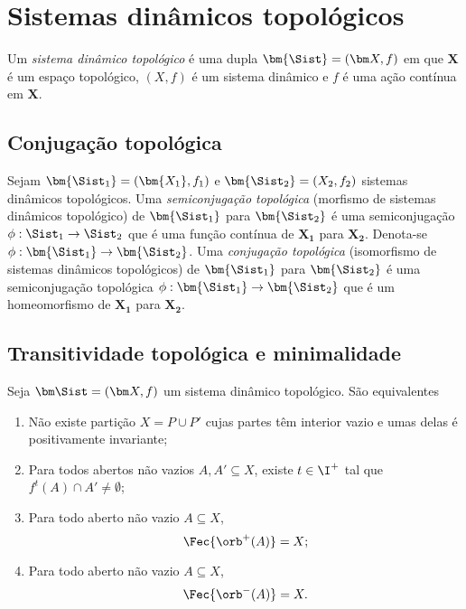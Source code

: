 \chapter{Sistemas dinâmicos topológicos}

\begin{definition}
Um \emph{sistema dinâmico topológico} é uma dupla $\bm{\Sist}=(\bm X,f)$ em que $\bm X$ é um espaço topológico, $(X,f)$ é um sistema dinâmico e $f$ é uma ação contínua em $\bm X$.
\end{definition}

\section{Conjugação topológica}

\begin{definition}
Sejam $\bm{\Sist_1} = (\bm{X_1},f_1)$ e $\bm{\Sist_2} = (X_2,f_2)$ sistemas dinâmicos topológicos. Uma \emph{semiconjugação topológica} (morfismo de sistemas dinâmicos topológico) de $\bm{\Sist_1}$ para $\bm{\Sist_2}$ é uma semiconjugação $\phi: \Sist_1 \to \Sist_2$ que é uma função contínua de $\bm{X_1}$ para $\bm{X_2}$. Denota-se $\phi: \bm{\Sist_1} \to \bm{\Sist_2}$. Uma \emph{conjugação topológica} (isomorfismo de sistemas dinâmicos topológicos) de $\bm{\Sist_1}$ para $\bm{\Sist_2}$ é uma semiconjugação topológica $\phi: \bm{\Sist_1} \to \bm{\Sist_2}$ que é um homeomorfismo de $\bm{X_1}$ para $\bm{X_2}$.
\end{definition}

\section{Transitividade topológica e minimalidade}

\begin{proposition}
Seja $\bm\Sist = (\bm X,f)$ um sistema dinâmico topológico. São equivalentes
	\begin{enumerate}
	\item Não existe partição $X = P \cup P'$ cujas partes têm interior vazio e umas delas é positivamente invariante;

	\item Para todos abertos não vazios $A,A' \subseteq X$, existe $t \in \I^+$ tal que $f^t(A) \cap A' \neq \emptyset$;

	\item Para todo aberto não vazio $A \subseteq X$,
		\begin{equation*}
		\Fec{\orb^+(A)} = X;
		\end{equation*}

	\item Para todo aberto não vazio $A \subseteq X$,
		\begin{equation*}
		\Fec{\orb^-(A)} = X.
		\end{equation*}
	\end{enumerate}
\end{proposition}

